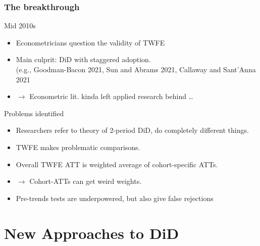 \documentclass[12pt,aspectratio=169]{beamer}\usepackage[]{graphicx}\usepackage[]{xcolor}
\begin{document}
\begin{frame}
\frametitle{The breakthrough}

    \begin{alertblock}{Mid 2010s}
    \small

    \begin{itemize}[itemsep=0em, topsep=0pt]
        \item Econometricians question the validity of TWFE
        \item Main culprit: DiD with staggered adoption.\\{\footnotesize (e.g., Goodman-Bacon 2021, Sun and Abrams 2021, Callaway and Sant'Anna 2021}
        \item $\rightarrow$ Econometric lit. kinda left applied research behind \dots
    \end{itemize}

    \end{alertblock}

    \begin{alertblock}{Problems identified}
    \small

    \begin{itemize}[itemsep=0em, topsep=0pt]
        \item Researchers refer to theory of 2-period DiD, do completely different things.
        \item TWFE makes problematic comparisons.
        \item Overall TWFE ATT is weighted average of cohort-specific ATTs.
        \item $\rightarrow$ Cohort-ATTs can get weird weights.
        \item Pre-trends tests are underpowered, but also give false rejections
    \end{itemize}

    \end{alertblock}

\end{frame}




\section{New Approaches to DiD}
\end{document}
